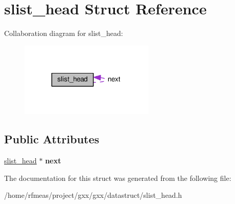 \hypertarget{structslist__head}{}\section{slist\+\_\+head Struct Reference}
\label{structslist__head}


Collaboration diagram for slist\+\_\+head\+:
\nopagebreak
\begin{figure}[H]
\begin{center}
\leavevmode
\includegraphics[width=181pt]{structslist__head__coll__graph}
\end{center}
\end{figure}
\subsection*{Public Attributes}
\begin{DoxyCompactItemize}
\item 
\hyperlink{structslist__head}{slist\+\_\+head} $\ast$ {\bfseries next}\hypertarget{structslist__head_abe09773660684f4b8d5cac0a721ebb6a}{}\label{structslist__head_abe09773660684f4b8d5cac0a721ebb6a}

\end{DoxyCompactItemize}


The documentation for this struct was generated from the following file\+:\begin{DoxyCompactItemize}
\item 
/home/rfmeas/project/gxx/gxx/datastruct/slist\+\_\+head.\+h\end{DoxyCompactItemize}

